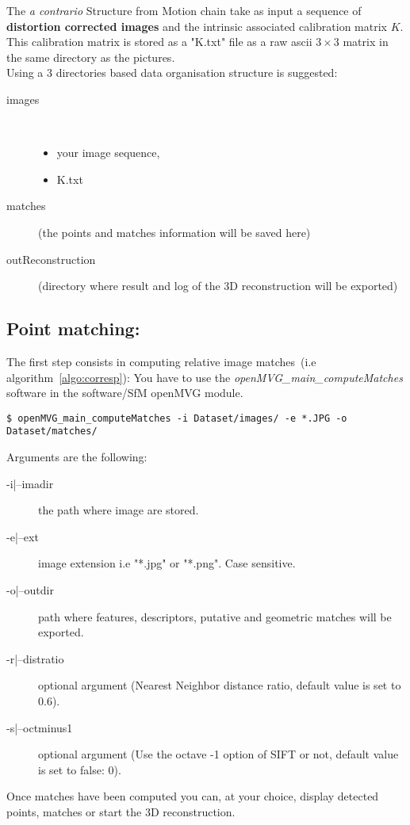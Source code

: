 \documentclass[11pt, letterpaper]{report}
\begin{document}
The {\em a contrario} Structure from Motion chain take as input a sequence of \textbf{distortion corrected images} and the intrinsic associated calibration matrix $K$. This calibration matrix is stored as a "K.txt" file as a raw ascii $3\times3$ matrix in the same directory as the pictures.\\
Using a 3 directories based data organisation structure is suggested:
\begin{description}
\item[images] ~
\begin{itemize}
\item your image sequence,
\item K.txt
\end{itemize}
\item[matches] (the points and matches information will be saved here)
\item[outReconstruction] (directory where result and log of the 3D reconstruction will be exported)
\end{description}

\subsection*{Point matching:}
The first step consists in computing relative image matches~(i.e algorithm~\ref{algo:corresp}):
You have to use the \textit{openMVG\_main\_computeMatches} software in the software/SfM openMVG module.
\vspace{-.5cm}
\begin{lstlisting}
$ openMVG_main_computeMatches -i Dataset/images/ -e *.JPG -o Dataset/matches/
\end{lstlisting}
Arguments are the following:
\begin{description}
\item[-i|--imadir] the path where image are stored.
\item[-e|--ext] image extension i.e "*.jpg" or "*.png". Case sensitive.
\item[-o|--outdir] path where features, descriptors, putative and geometric matches will be exported.
\item[-r|--distratio] optional argument (Nearest Neighbor distance ratio, default value is set to 0.6).
\item[-s|--octminus1] optional argument (Use the octave -1 option of SIFT or not, default value is set to false: 0).
\end{description}

Once matches have been computed you can, at your choice, display detected points, matches or start the 3D reconstruction.
\end{document}
